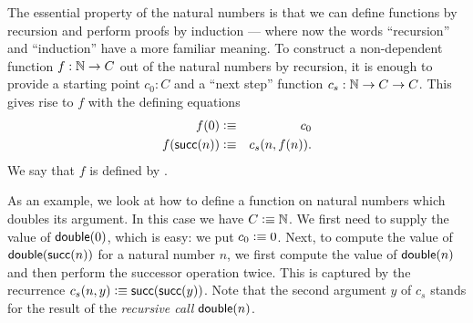 The essential property of the natural numbers is that we can define functions by recursion and perform proofs by induction --- where now the words ``recursion'' and ``induction'' have a more familiar meaning.
%
To construct a non-dependent function $f : \mathbb{N} \to C$ out of the natural numbers by recursion, it is enough to provide a starting point $c_0 : C$ and a ``next step'' function $c_s : \mathbb{N} \to C \to C$.
This gives rise to $f$ with the defining equations
\begin{eqnarray*}
  f(0) & \vcentcolon\equiv & c_0 \\
  f(\mathsf{succ}(n)) & \vcentcolon\equiv & c_s(n,f(n)).
\end{eqnarray*}
We say that $f$ is defined by .
%
%

As an example, we look at how to define a function on natural numbers which doubles its argument.
In this case we have $C\vcentcolon\equiv \mathbb{N}$.
We first need to supply the value of $\mathsf{double}(0)$, which is easy: we put $c_0 \vcentcolon\equiv 0$.
Next, to compute the value of $\mathsf{double}(\mathsf{succ}(n))$ for a natural number $n$, we first compute the value of $\mathsf{double}(n)$ and then perform the successor operation twice.
This is captured by the recurrence $c_s(n,y) \vcentcolon\equiv \mathsf{succ}(\mathsf{succ}(y))$.
Note that the second argument $y$ of $c_s$ stands for the result of the \emph{recursive call} $\mathsf{double}(n)$.

